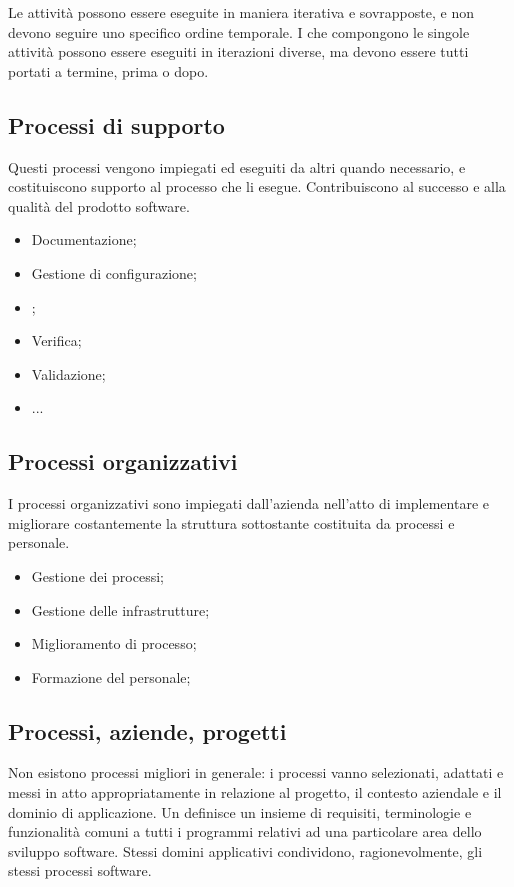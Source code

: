 Le attività possono essere eseguite in maniera iterativa e sovrapposte, e non
devono seguire uno specifico ordine temporale. I  che compongono
le singole attività possono essere eseguiti in iterazioni diverse, ma devono
essere tutti portati a termine, prima o dopo. %

\subsection{Processi di supporto}

Questi processi vengono impiegati ed eseguiti da altri quando necessario, e
costituiscono supporto al processo che li esegue. Contribuiscono al successo e
alla qualità del prodotto software.

\begin{itemize}
  \item Documentazione;
  \item Gestione di configurazione;
  \item {};
  \item Verifica;
  \item Validazione;
  \item ...
\end{itemize}

\subsection{Processi organizzativi}

I processi organizzativi sono impiegati dall'azienda nell'atto di implementare e
migliorare costantemente la struttura sottostante costituita da processi e
personale.

\begin{itemize}
  \item Gestione dei processi;
  \item Gestione delle infrastrutture;
  \item Miglioramento di processo;
  \item Formazione del personale;
\end{itemize}

\subsection{Processi, aziende, progetti}

Non esistono processi migliori in generale: i processi vanno selezionati,
adattati e messi in atto appropriatamente in relazione al progetto, il contesto
aziendale e il dominio di applicazione. Un 
definisce un insieme di requisiti, terminologie e funzionalità comuni a tutti i
programmi relativi ad una particolare area dello sviluppo software. Stessi
domini applicativi condividono, ragionevolmente, gli stessi processi software.

